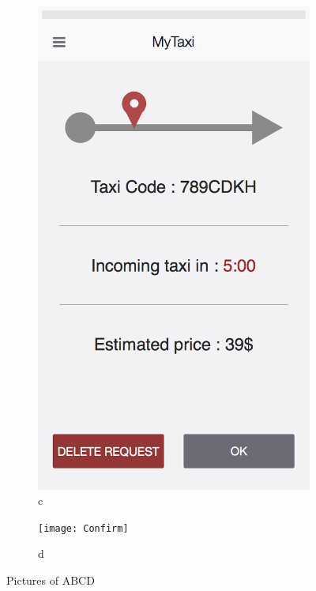 \begin{figure}
    \begin{subfigure}[b]{0.25\textwidth}
            \includegraphics[width=\textwidth]{mobileapppng/Pending Request}
            \caption{c}
            \label{fig:c}
    \end{subfigure}
    \begin{subfigure}[b]{0.25\textwidth}
            \texttt{[image: Confirm]}
            \caption{d}
            \label{fig:d}
    \end{subfigure}
    \caption{Pictures of ABCD}\label{fig:ABCD}
\end{figure}